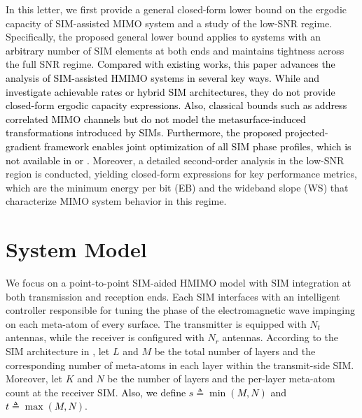\documentclass[twocolumn,10pt]{IEEEtran}
\begin{document}
	
	In this letter, we first provide a general closed-form lower bound on the ergodic capacity of SIM-assisted MIMO system and a study of the low-SNR regime. Specifically, the proposed general lower bound applies to systems with an \textcolor{black}{arbitrary} number of SIM elements at both ends and maintains tightness across the full SNR regime. \textcolor{black}{	Compared with existing works, this paper advances the analysis of
		SIM-assisted HMIMO systems in several key ways. While  \cite{An2023} and  \cite{Papazafeiropoulos2024}
		investigate achievable rates or hybrid SIM architectures, they do not
		provide closed-form ergodic capacity expressions. Also, classical bounds such
		as \cite{Matthaiou2011a} address correlated MIMO channels but do not model the
		metasurface-induced transformations introduced by  SIMs.  Furthermore, the
		proposed projected-gradient framework enables joint optimization of all
		SIM phase profiles, which is not available in \cite{An2023} or \cite{Matthaiou2011a}.} Moreover, a detailed second-order analysis in the low-SNR region is conducted, yielding closed-form expressions for key performance metrics, which are the minimum energy per bit (EB) and the wideband slope (WS) that characterize MIMO system behavior in this  regime.  

	
	
	

	
	\section{System Model}\label{System}
	We focus on a point-to-point SIM-aided HMIMO model with SIM integration at both transmission and reception ends. Each SIM interfaces with an intelligent controller responsible for tuning the phase of the electromagnetic wave impinging on each meta-atom of every surface. 
	The transmitter is equipped with $ N_{t} $ antennas, while the receiver is configured with $ N_{r} $ antennas. According to the SIM  architecture  in \cite{An2023,Papazafeiropoulos2024a}, let  $ L $ and $M$ be the total number of layers and the corresponding number of meta-atoms in each layer within the transmit-side SIM. Moreover, let  $ K $ and $N$ be the number of layers and the per-layer meta-atom count at the receiver  SIM. \textcolor{black}{Also, we define  $s\triangleq \min(M,N)$ and $t \triangleq \max(M,N)$}.
	
\end{document}
